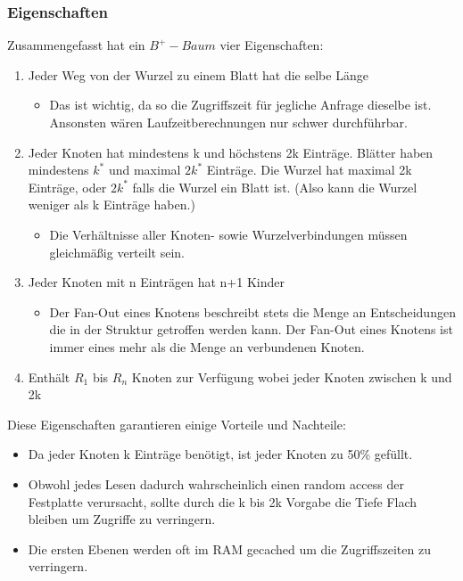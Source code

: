 \documentclass{article}
\begin{document}
	\subsubsection{Eigenschaften}
	Zusammengefasst hat ein $B^+-Baum$ vier Eigenschaften:
	\begin{enumerate}
		\item{Jeder Weg von der Wurzel zu einem Blatt hat die selbe Länge}
		\begin{itemize}
			\item{Das ist wichtig, da so die Zugriffszeit für jegliche Anfrage dieselbe ist. Ansonsten wären Laufzeitberechnungen nur schwer durchführbar.}
		\end{itemize}
		\item{Jeder Knoten hat mindestens k und höchstens 2k Einträge. Blätter haben mindestens $k^*$ und maximal $2k^*$ Einträge. Die Wurzel hat maximal 2k Einträge, oder $2k^*$ falls die Wurzel ein Blatt ist. (Also kann die Wurzel weniger als k Einträge haben.)}
		\begin{itemize}
			\item{Die Verhältnisse aller Knoten- sowie Wurzelverbindungen müssen gleichmäßig verteilt sein.}
		\end{itemize}
		\item{Jeder Knoten mit n Einträgen hat n+1 Kinder}
		\begin{itemize}
			\item{Der Fan-Out eines Knotens beschreibt stets die Menge an Entscheidungen die in der Struktur getroffen werden kann. Der Fan-Out eines Knotens ist immer eines mehr als die Menge an verbundenen Knoten.}
		\end{itemize}
		\item{Enthält $R_1$ bis $R_n$ Knoten zur Verfügung wobei jeder Knoten zwischen k und 2k }
	\end{enumerate}
	Diese Eigenschaften garantieren einige Vorteile und Nachteile:
	\begin{itemize}
		\item{Da jeder Knoten k Einträge benötigt, ist jeder Knoten zu 50\% gefüllt.}
		\item{Obwohl jedes Lesen dadurch wahrscheinlich einen random access der Festplatte verursacht, sollte durch die k bis 2k Vorgabe die Tiefe Flach bleiben um Zugriffe zu verringern.}
		\item{Die ersten Ebenen werden oft im RAM gecached um die Zugriffszeiten zu verringern.}
	\end{itemize}
\end{document}
